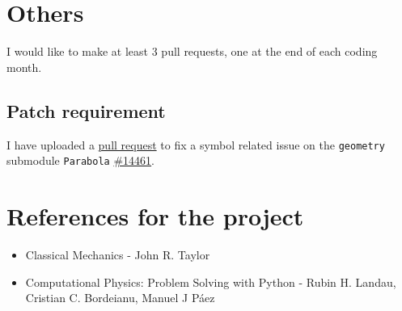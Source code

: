 \documentclass[12pt]{article}
\begin{document}
\section{Others}
I would like to make at least 3 pull requests, one at the end of each coding month.
	\subsection{Patch requirement}
		I have uploaded a \href{https://github.com/sympy/sympy/pull/16601}{pull request} to fix a symbol related issue on the \texttt{geometry} submodule \texttt{Parabola} \href{https://github.com/sympy/sympy/pull/16601}{\#14461}.

\section{References for the project}
	\begin{itemize}
		\item Classical Mechanics - John R. Taylor
		\item Computational Physics: Problem Solving with Python - Rubin H. Landau, Cristian C. Bordeianu, Manuel J Páez
	\end{itemize}
\end{document}
